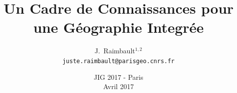 \documentclass[english,11pt]{beamer}
\begin{document}
\title{Un Cadre de Connaissances pour une G{\'e}ographie Integr{\'e}e}

\author{J.~Raimbault$^{1,2}$\\
\texttt{juste.raimbault@parisgeo.cnrs.fr}
}




\date{JIG 2017 - Paris\\ Avril 2017
}

\frame{\maketitle}






\end{document}
